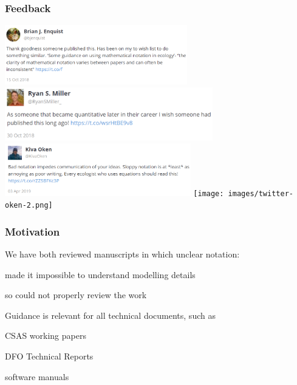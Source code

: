 \begin{frame}
\frametitle{Feedback}

\centering
\includegraphics[height=2.6cm]{images/twitter-enquist.png}
\includegraphics[height=2.3cm]{images/twitter-miller.png}
\includegraphics[height=2.3cm]{images/twitter-oken.png} \texttt{[image: images/twitter-oken-2.png]}

\end{frame}


%
%



\begin{frame}
\frametitle{Motivation}

We have both reviewed manuscripts in which unclear notation:
\bi
\item made it impossible to understand modelling details
\item {}
\item so could not properly review the work
\ei

\pause
\medskip

Guidance is relevant for all technical documents, such as
\bi
\item CSAS working papers
\item DFO Technical Reports
\item software manuals
  \ei

\end{frame}

